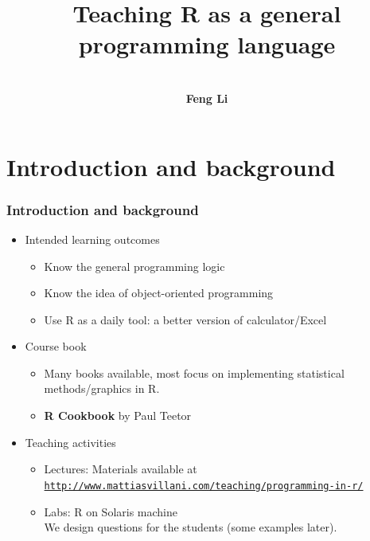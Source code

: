 \documentclass[10pt]{beamer}
\title[Teaching R]{{\textbf{Teaching R as a general programming language}}}
\author[Feng Li]{\\ \textbf{Feng Li}}
\institute[Stockholm University]{\footnotesize{\textbf{Department of
      Statistics, Stockholm University}}}
\date{\color{SUblue}{ \textbf{Nov, 2012}}}
\begin{document}

\begin{frame}[plain]
  \titlepage

\end{frame}


\section{Introduction and background}

\begin{frame}
  \frametitle{Introduction and background}
  \begin{itemize}

  \item Intended learning outcomes
    \begin{itemize}
    \item Know the general programming logic
    \item Know the idea of object-oriented programming
    \item Use R as a daily tool: a better version of calculator/Excel

    \end{itemize}

  \item Course book
    \begin{itemize}
    \item  Many books available, most focus on implementing statistical
      methods/graphics in R.
    \item \textbf{R Cookbook} by Paul Teetor
    \end{itemize}

  \item Teaching activities
    \begin{itemize}
    \item Lectures: Materials available at
      \texttt{\url{http://www.mattiasvillani.com/teaching/programming-in-r/}}
    \item Labs: R on Solaris machine
      \\We design questions for the students (some examples later).
    \end{itemize}
  \end{itemize}
\end{frame}
\end{document}
